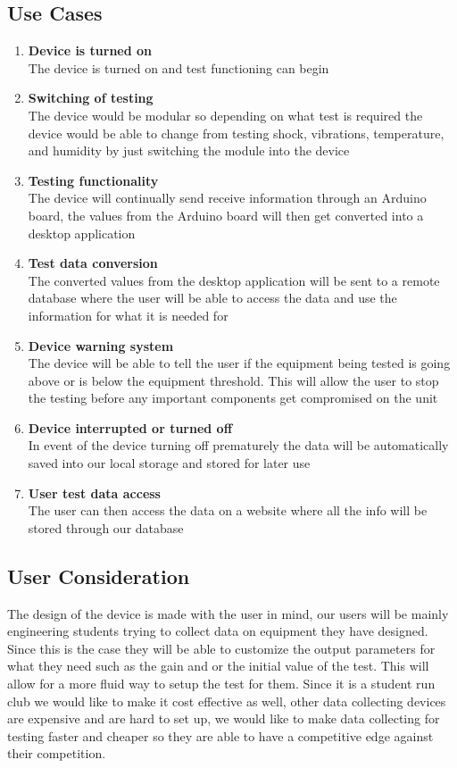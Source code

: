 \documentclass[12pt]{article}
\begin{document}
\subsection{Use Cases} 
\begin{enumerate}
  
  \item \textbf{Device is turned on}\\ The device is turned on and test functioning can begin \item \textbf{Switching of testing}\\ The device would be modular so depending on what test is required the device would be able to change from testing shock, vibrations, temperature, and humidity by just switching the module into the device \item \textbf{Testing functionality}\\ The device will continually send receive information through an Arduino board, the values from the Arduino board will then get converted into a desktop application \item \textbf{Test data conversion}\\ The converted values from the desktop application will be sent to a remote database where the user will be able to access the data and use the information for what it is needed for \item \textbf{Device warning system}\\ The device will be able to tell the user if the equipment being tested is going above or is below the equipment threshold. This will allow the user to stop the testing before any important components get compromised on the unit \item \textbf{Device interrupted or turned off}\\ In event of the device turning off prematurely the data will be automatically saved into our local storage and stored for later use \item \textbf{User test data access}\\ The user can then access the data on a website where all the info will be stored through our database


  
\end{enumerate}

\subsection{User Consideration}
The design of the device is made with the user in mind, our users will be mainly engineering students trying to collect data on equipment they have designed. Since this is the case they will be able to customize the output parameters for what they need such as the gain and or the initial value of the test. This will allow for a more fluid way to setup the test for them. Since it is a student run club we would like to make it cost effective as well, other data collecting devices are expensive and are hard to set up, we would like to make data collecting for testing faster and cheaper so they are able to have a competitive edge against their competition.
\end{document}
